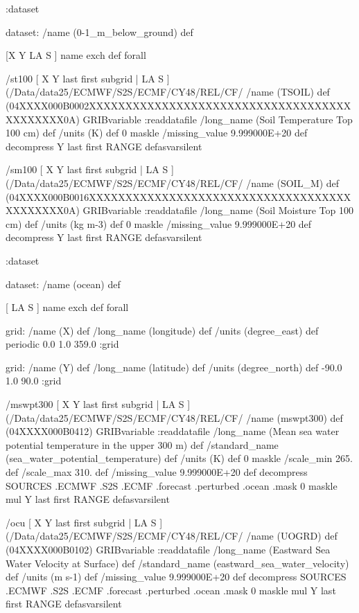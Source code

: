 \begin{ingrid}
:dataset

dataset:
/name (0-1_m_below_ground) def

[X Y LA S ] {name exch def } forall

/st100 { [ X Y last first subgrid | LA S ] (/Data/data25/ECMWF/S2S/ECMF/CY48/REL/CF/%
/name (TSOIL) def
(04XXXX000B0002XXXXXXXXXXXXXXXXXXXXXXXXXXXXXXXXXXXXXXXXXXXX0A) GRIBvariable
:readdatafile
/long_name (Soil Temperature Top 100 cm) def
/units (K) def
0 maskle
/missing_value 9.999000E+20 def
decompress
Y last first RANGE
} defasvarsilent

/sm100 { [ X Y last first subgrid | LA S ] (/Data/data25/ECMWF/S2S/ECMF/CY48/REL/CF/%
/name (SOIL_M) def
(04XXXX000B0016XXXXXXXXXXXXXXXXXXXXXXXXXXXXXXXXXXXXXXXXXXXX0A) GRIBvariable
:readdatafile
/long_name (Soil Moisture Top 100 cm) def
/units (kg m-3) def
0 maskle
/missing_value 9.999000E+20 def
decompress
Y last first RANGE
} defasvarsilent

:dataset

dataset:
/name (ocean) def

[ LA S ] {name exch def } forall

grid:
/name (X) def
/long_name (longitude) def
/units (degree_east) def
periodic
0.0 1.0 359.0
:grid

grid:
/name (Y) def
/long_name (latitude) def
/units (degree_north) def
-90.0 1.0 90.0
:grid

/mswpt300 { [ X Y last first subgrid | LA S ] (/Data/data25/ECMWF/S2S/ECMF/CY48/REL/CF/%
/name (mswpt300) def
(04XXXX000B0412) GRIBvariable
:readdatafile
/long_name (Mean sea water potential temperature in the upper 300 m) def
/standard_name (sea_water_potential_temperature) def
/units (K) def
0 maskle
/scale_min 265. def
/scale_max 310. def
/missing_value 9.999000E+20 def
decompress
  SOURCES .ECMWF .S2S .ECMF .forecast .perturbed .ocean .mask
   0 maskle
   mul
Y last first RANGE
} defasvarsilent

/ocu { [ X Y last first subgrid | LA S ] (/Data/data25/ECMWF/S2S/ECMF/CY48/REL/CF/%
/name (UOGRD) def
(04XXXX000B0102) GRIBvariable
:readdatafile
/long_name (Eastward Sea Water Velocity at Surface) def
/standard_name (eastward_sea_water_velocity) def
/units (m s-1) def
/missing_value 9.999000E+20 def
decompress
  SOURCES .ECMWF .S2S .ECMF .forecast .perturbed .ocean .mask
   0 maskle
   mul
Y last first RANGE
} defasvarsilent


\end{ingrid}
